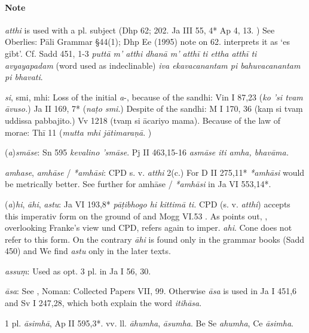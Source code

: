 \documentclass[11pt]{article}
\newcommand*\ṛ{r\symbol{"325}}
\newcommand*\Ṛ{R\symbol{"325}}
\newcommand*\ṝ{r\symbol{"304}\symbol{"325}}
\newcommand*\Ṝ{R\symbol{"304}\symbol{"325}}
\newcommand*\ḷ{l\symbol{"325}}
\newcommand*\ḹ{l\symbol{"304}\symbol{"325}}
\newcommand*\Ḷ{L\symbol{"325}}
\newcommand*\Ḹ{L\symbol{"304}\symbol{"325}}
\begin{document}
\paragraph*{Note}
\textit{atthi} is used with a pl. subject (Dhp 62; 202. Ja III 55, 4* Ap 4, 13. )
See Oberlies: Pāli Grammar §44(1); Dhp Ee (1995) note on 62.
\citet[315]{Bechert:1958} interprets it as `es gibt'.
Cf. Sadd 451, 1-3 \textit{puttā m' atthi dhanā m' atthī ti ettha atthī ti avyayapadam} (word used as indeclinable)
\textit{iva ekavacanantam pi bahuvacanantam pi bhavati}.

\textit{si}, {smi}, {mhi}: Loss of the initial \textit{a}-, because of the sandhi: Vin I 87,23 (\textit{ko 'si tvam āvuso.}) Ja II 169, 7* (\textit{naṭo smi}.)
Despite of the sandhi: M I 170, 36 (kaṃ si tvaṃ uddissa pabbajito.) Vv 1218 (tvaṃ si ācariyo mama).
Because of the law of morae: Thī 11 (\textit{mutta mhi jātimaraṇā}. )

(\textit{a})\textit{smāse}: Sn 595 \textit{kevalino 'smāse}. Pj II 463,15-16 \textit{asmāse iti amha, bhavāma.}

\textit{amhase}, \textit{amhāse} / \textit{*amhāsi}:
CPD s. v. \textit{atthi} 2(c.) For D II 275,11* \textit{*amhāsi} would be metrically better.
See further \citet[52]{alsdorf:57} for {amhāse} / \textit{*amhāsi} in Ja VI 553,14*.

(\textit{a})\textit{hi}, \textit{āhi}, \textit{astu}: Ja VI 193,8* \textit{pāṭibhogo hi kittimā ti.}
CPD (s. v. \textit{atthi}) accepts this imperativ form on the ground of \citet[36]{franke:02} and Mogg VI.53 .
As \citet[111]{Oberlies:1995} points out, \citet[35]{alsdorf:1977}, overlooking Franke's view und CPD, refers again to imper. \textit{ahi}.
Cone does not refer to this form.
On the contrary \textit{āhi} is found only in the grammar books (Sadd 450) and We find \textit{astu} only in the later texts.


\textit{assuṃ}: Used as opt. 3 pl. in Ja I 56, 30.

\textit{āsa}: See \citet[39]{vonhinueber:77}, Noman: Collected Papers VII, 99.
Otherwise \textit{āsa} is used in Ja I 451,6 and Sv I 247,28, which both explain the word \textit{itihāsa}.

1 pl. \textit{āsimhā}, Ap II 595,3*. vv. ll. \textit{āhumha}, \textit{āsumha}. Be Se \textit{ahumha}, Ce \textit{āsimha}.
\end{document}
